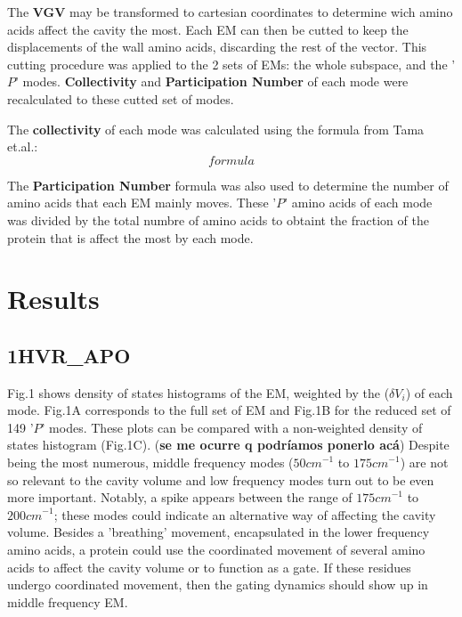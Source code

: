 \documentclass[10pt,letterpaper]{article}
\begin{document}
The \textbf{VGV} may be transformed to cartesian coordinates to determine wich amino acids affect the cavity the most. Each EM can then be cutted to keep the displacements of the wall amino acids, discarding the rest of the vector. This cutting procedure was applied to the 2 sets of EMs: the whole subspace, and the '\({P}\)' modes. \textbf{Collectivity} and \textbf{Participation Number} of each mode were recalculated to these cutted set of modes.\newline

The \textbf{collectivity} of each mode was calculated using the formula from Tama et.al.:
$$
formula
$$\newline

The \textbf{Participation Number} formula was also used to determine the number of amino acids that each EM mainly moves. These '\({P}\)' amino acids of each mode was divided by the total numbre of amino acids to obtaint the fraction of the protein that is affect the most by each mode.




\newpage
\section{Results}
\subsection{1HVR\_APO}
Fig.1 shows density of states histograms of the EM, weighted by the (\(\delta V_{i}\)) of each mode. Fig.1A corresponds to the full set of EM and Fig.1B for the reduced set of 149 '\(P\)' modes. These plots can be compared with a non-weighted density of states histogram (Fig.1C). (\textbf{se me ocurre q podríamos ponerlo acá}) Despite being the most numerous, middle frequency modes (\({50cm}^{-1}\) to \({175cm}^{-1}\)) are not so relevant to the cavity volume and low frequency modes turn out to be even more important. Notably, a spike appears between the range of    \({175cm}^{-1}\) to \({200cm}^{-1}\); these modes could indicate an alternative way of affecting the cavity volume. Besides a 'breathing' movement, encapsulated in the lower frequency amino acids, a protein could use the coordinated movement of several amino acids to affect the cavity volume or to function as a gate. If these residues undergo coordinated movement, then the gating dynamics should show up in middle frequency EM.
\clearpage
\end{document}
